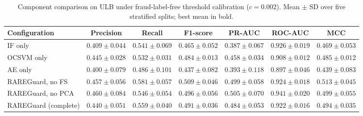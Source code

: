 \begin{table}[t]
\centering
\caption{Component comparison on ULB under fraud-label-free threshold calibration ($c=0.002$). Mean $\pm$ SD over five stratified splits; best mean in bold.}
\label{tab:main}
\small
\begin{tabular}{lcccccc}
\toprule
Configuration & Precision & Recall & F1-score & PR-AUC & ROC-AUC & MCC \\
\midrule
IF only & $0.409\pm0.044$ & $0.541\pm0.069$ & $0.465\pm0.052$ & $0.387\pm0.067$ & $0.926\pm0.019$ & $0.469\pm0.053$ \\
OCSVM only & $0.445\pm0.028$ & $0.532\pm0.031$ & $0.484\pm0.013$ & $0.458\pm0.034$ & $0.908\pm0.012$ & $0.485\pm0.012$ \\
AE only & $0.400\pm0.079$ & $0.486\pm0.101$ & $0.437\pm0.082$ & $0.393\pm0.118$ & $0.897\pm0.046$ & $0.439\pm0.083$ \\
RAREGuard, no FS & $0.457\pm0.056$ & $\mathbf{0.581}\pm0.057$ & $\mathbf{0.509}\pm0.046$ & $0.499\pm0.058$ & $0.924\pm0.018$ & $\mathbf{0.513}\pm0.045$ \\
RAREGuard, no PCA & $\mathbf{0.460}\pm0.084$ & $0.546\pm0.054$ & $0.496\pm0.056$ & $\mathbf{0.505}\pm0.070$ & $\mathbf{0.941}\pm0.020$ & $0.499\pm0.055$ \\
RAREGuard (complete) & $0.440\pm0.051$ & $0.559\pm0.040$ & $0.491\pm0.036$ & $0.484\pm0.053$ & $0.922\pm0.016$ & $0.494\pm0.035$ \\
\bottomrule
\end{tabular}
\end{table}
